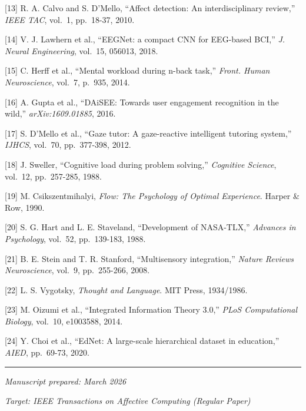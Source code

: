 \documentclass[
]{article}
\begin{document}
{[}13{]} R. A. Calvo and S. D'Mello, ``Affect detection: An
interdisciplinary review,'' \emph{IEEE TAC}, vol.~1, pp.~18-37, 2010.

{[}14{]} V. J. Lawhern et al., ``EEGNet: a compact CNN for EEG-based
BCI,'' \emph{J. Neural Engineering}, vol.~15, 056013, 2018.

{[}15{]} C. Herff et al., ``Mental workload during n-back task,''
\emph{Front. Human Neuroscience}, vol.~7, p.~935, 2014.

{[}16{]} A. Gupta et al., ``DAiSEE: Towards user engagement recognition
in the wild,'' \emph{arXiv:1609.01885}, 2016.

{[}17{]} S. D'Mello et al., ``Gaze tutor: A gaze-reactive intelligent
tutoring system,'' \emph{IJHCS}, vol.~70, pp.~377-398, 2012.

{[}18{]} J. Sweller, ``Cognitive load during problem solving,''
\emph{Cognitive Science}, vol.~12, pp.~257-285, 1988.

{[}19{]} M. Csikszentmihalyi, \emph{Flow: The Psychology of Optimal
Experience}. Harper \& Row, 1990.

{[}20{]} S. G. Hart and L. E. Staveland, ``Development of NASA-TLX,''
\emph{Advances in Psychology}, vol.~52, pp.~139-183, 1988.

{[}21{]} B. E. Stein and T. R. Stanford, ``Multisensory integration,''
\emph{Nature Reviews Neuroscience}, vol.~9, pp.~255-266, 2008.

{[}22{]} L. S. Vygotsky, \emph{Thought and Language}. MIT Press,
1934/1986.

{[}23{]} M. Oizumi et al., ``Integrated Information Theory 3.0,''
\emph{PLoS Computational Biology}, vol.~10, e1003588, 2014.

{[}24{]} Y. Choi et al., ``EdNet: A large-scale hierarchical dataset in
education,'' \emph{AIED}, pp.~69-73, 2020.

\begin{center}\rule{0.5\linewidth}{0.5pt}\end{center}

\emph{Manuscript prepared: March 2026}

\emph{Target: IEEE Transactions on Affective Computing (Regular Paper)}
\end{document}
